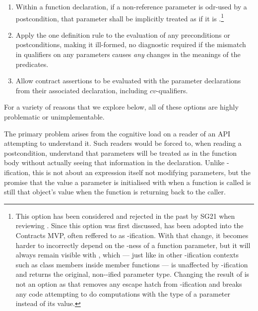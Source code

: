 \begin{enumerate}
\item Within a function declaration, if a non-reference parameter is odr-used by a postcondition, that parameter shall be implicitly treated as if it is .\footnote{This option has been considered and rejected in the past by SG21 when reviewing \cite{P2829R0}. Since this option was first discussed, \cite{P3071R1} has been adopted into the Contracts MVP, often reffered to as -ification.   With that change, it becomes harder to incorrectly depend on the -ness of a function parameter, but it will always remain visible with , which --- just like in other -ification contexts such as class members inside  member functions --- is unaffected by -ification and returns the original, non--ified parameter type.  Changing the result of  is not an option as that removes any escape hatch from -ification and breaks any code attempting to do computations with the type of a parameter instead of its value.}

\item Apply the one definition rule to the evaluation of any preconditions or postconditions, making it ill-formed, no diagnostic required if the mismatch in  qualifiers on any parameters causes \emph{any} changes in the meanings of the predicates.
\item Allow contract assertions to be evaluated with the parameter declarations from their associated declaration, including $cv$-qualifiers.
\end{enumerate}
       
For a variety of reasons that we explore below, all of these options are highly problematic or unimplementable.

The primary problem arises from the cognitive load on a reader of an API attempting to understand it.  Such readers would be forced to, when reading a postcondition, understand that parameters will be treated as  in the function body without actually seeing that information in the declaration.  Unlike -ification, this is not about an expression itself not modifying parameters, but the promise that the value a parameter is initialised with when a function is called is still that object's value when the function is returning back to the caller.


